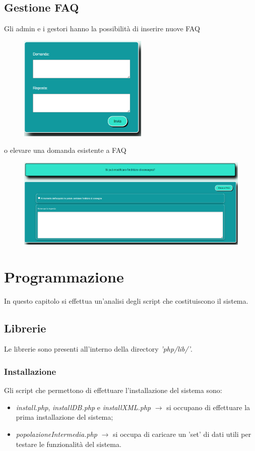 \documentclass[a4paper, 14pt]{article}
\begin{document}
\begin{flushleft}
			\subsection{Gestione FAQ}
				Gli admin e i gestori hanno la possibilità di inserire nuove FAQ
				\begin{figure}[H]
					\centering
					\includegraphics[height=5cm, frame=2pt]{"screenInserimentoFaq.png"}	
				\end{figure}
				o elevare una domanda esistente a FAQ
				\begin{figure}[H]
					\centering
					\includegraphics[width=\textwidth, frame=2pt]{"screenElevaFaq.png"}	
				\end{figure}
		\newpage
	\section{Programmazione}
		In questo capitolo si effettua un'analisi degli script che costituiscono il sistema.
		\subsection{Librerie}
			Le librerie sono presenti all'interno della directory \textit{'php/lib/'}. \\
			\subsubsection{Installazione}
			Gli script che permettono di effettuare l'installazione del sistema sono:
				\begin{itemize}
					\item \textit{install.php}, \textit{installDB.php} e \textit{installXML.php} $\rightarrow$ si occupano di effettuare la prima 
									installazione del sistema;
					\item \textit{popolazioneIntermedia.php} $\rightarrow$ si occupa di caricare un 'set' di dati utili per testare le funzionalità del
									sistema.
				\end{itemize}
			

\end{flushleft}
\end{document}
